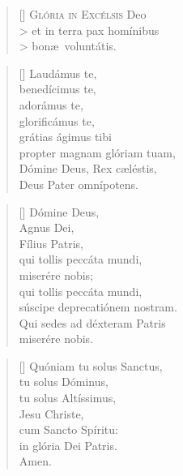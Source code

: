 \documentclass[omni.tex]{subfiles}
\begin{document}
\settowidth{\versewidth}{Et ne nos ind\'ucas in tentati\'onem}

\begin{verse}[\versewidth]
\lettrine[lhang=1.0,nindent=0em]{G}{l\'oria in Exc\'elsis} Deo \\>
et in terra pax hom\'inibus \\>
bon\ae\ volunt\'atis. \\
\end{verse}

\begin{verse}[\versewidth]
Laud\'amus te, \\
bened\'icimus te, \\
ador\'amus te, \\
glorific\'amus te, \\
gr\'atias \'agimus tibi \\
propter magnam gl\'oriam tuam, \\
D\'omine Deus, Rex c\ae l\'estis, \\
Deus Pater omn\'ipotens. \\
\end{verse}

\begin{verse}[\versewidth]
D\'omine Deus, \\
Agnus Dei, \\
F\'ilius Patris, \\
\pagebreak
qui tollis pecc\'ata mundi, \\
miser\'ere nobis; \\
qui tollis pecc\'ata mundi, \\
s\'uscipe deprecati\'onem nostram. \\
Qui sedes ad d\'exteram Patris \\
miser\'ere nobis. \\
\end{verse}

\begin{verse}[\versewidth]
Qu\'oniam tu solus Sanctus, \\
tu solus D\'ominus, \\
tu solus Alt\'issimus, \\
Jesu Christe, \\
cum Sancto Sp\'iritu: \Cross \\
in gl\'oria Dei Patris. \\
Amen. \\[4\baselineskip]
\end{verse}
\pagebreak
\end{document}
